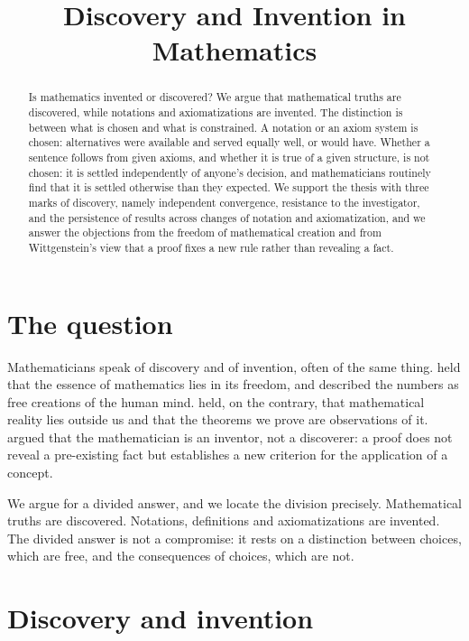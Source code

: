 \documentclass{situationist-preprint}
\title{Discovery and Invention in Mathematics}
\begin{document}
\maketitle

\begin{abstract}
Is mathematics invented or discovered? We argue that mathematical truths are discovered, while notations and axiomatizations are invented. The distinction is between what is chosen and what is constrained. A notation or an axiom system is chosen: alternatives were available and served equally well, or would have. Whether a sentence follows from given axioms, and whether it is true of a given structure, is not chosen: it is settled independently of anyone's decision, and mathematicians routinely find that it is settled otherwise than they expected. We support the thesis with three marks of discovery, namely independent convergence, resistance to the investigator, and the persistence of results across changes of notation and axiomatization, and we answer the objections from the freedom of mathematical creation and from Wittgenstein's view that a proof fixes a new rule rather than revealing a fact.
\end{abstract}

\section{The question}

Mathematicians speak of discovery and of invention, often of the same thing. \citet[§8]{Cantor1883} held that the essence of mathematics lies in its freedom, and \citet{Dedekind1888} described the numbers as free creations of the human mind. \citet{Hardy1940} held, on the contrary, that mathematical reality lies outside us and that the theorems we prove are observations of it. \citet{Wittgenstein1956} argued that the mathematician is an inventor, not a discoverer: a proof does not reveal a pre-existing fact but establishes a new criterion for the application of a concept.

We argue for a divided answer, and we locate the division precisely. Mathematical truths are discovered. Notations, definitions and axiomatizations are invented. The divided answer is not a compromise: it rests on a distinction between choices, which are free, and the consequences of choices, which are not.

\section{Discovery and invention}
\end{document}
